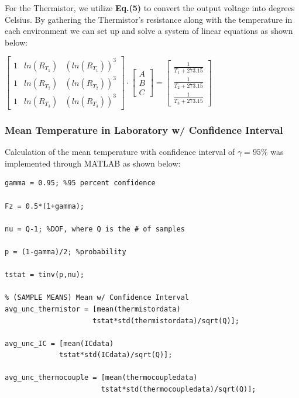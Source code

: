 \documentclass{article}
\begin{document}
For the Thermistor, we utilize \textbf{Eq.(5)} to convert the output voltage into degrees Celsius. By gathering the Thermistor's resistance along with the temperature in each environment we can set up and solve a system of linear equations as shown below:
\begin{center}
    $\begin{bmatrix}
        1 & ln(R_{T_{1}}) & (ln(R_{T_{1}}))^{3}\\[3pt]
        1 & ln(R_{T_{2}}) & (ln(R_{T_{2}}))^{3}\\[3pt]
        1 & ln(R_{T_{3}}) & (ln(R_{T_{3}}))^{3}
    \end{bmatrix}
    \cdot
    \begin{bmatrix}
        A\\[3pt]
        B\\[3pt]
        C
    \end{bmatrix}
    = 
    \begin{bmatrix}
        \frac{1}{T_{1}+273.15}\\[3pt]
            
        \frac{1}{T_{2}+273.15}\\[3pt]
        
        \frac{1}{T_{3}+273.15}
    \end{bmatrix}$
\end{center}

\subsubsection*{Mean Temperature in Laboratory w/ Confidence Interval}
Calculation of the mean temperature with confidence interval of $\gamma = 95\%$ was implemented through MATLAB as shown below:
\begin{lstlisting}[style=Matlab-editor]
% Confidence Interval in Laboratory
gamma = 0.95; %95 percent confidence

Fz = 0.5*(1+gamma);

nu = Q-1; %DOF, where Q is the # of samples

p = (1-gamma)/2; %probability

tstat = tinv(p,nu); 

% (SAMPLE MEANS) Mean w/ Confidence Interval
avg_unc_thermistor = [mean(thermistordata) 
                     tstat*std(thermistordata)/sqrt(Q)];

avg_unc_IC = [mean(ICdata) 
             tstat*std(ICdata)/sqrt(Q)];

avg_unc_thermocouple = [mean(thermocoupledata)  
                       tstat*std(thermocoupledata)/sqrt(Q)];
\end{lstlisting}
\end{document}
